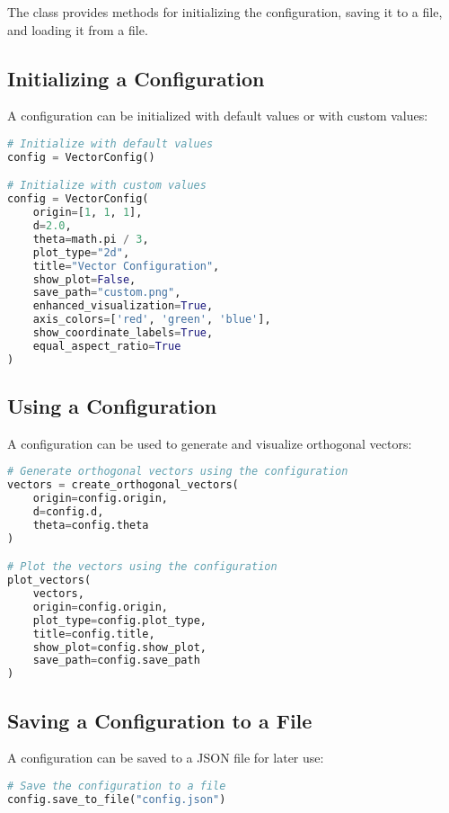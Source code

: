 The class provides methods for initializing the configuration, saving it to a file, and loading it from a file.

\subsection{Initializing a Configuration}

A configuration can be initialized with default values or with custom values:

\begin{lstlisting}[language=Python]
# Initialize with default values
config = VectorConfig()

# Initialize with custom values
config = VectorConfig(
    origin=[1, 1, 1],
    d=2.0,
    theta=math.pi / 3,
    plot_type="2d",
    title="Vector Configuration",
    show_plot=False,
    save_path="custom.png",
    enhanced_visualization=True,
    axis_colors=['red', 'green', 'blue'],
    show_coordinate_labels=True,
    equal_aspect_ratio=True
)
\end{lstlisting}

\subsection{Using a Configuration}

A configuration can be used to generate and visualize orthogonal vectors:

\begin{lstlisting}[language=Python]
# Generate orthogonal vectors using the configuration
vectors = create_orthogonal_vectors(
    origin=config.origin,
    d=config.d,
    theta=config.theta
)

# Plot the vectors using the configuration
plot_vectors(
    vectors,
    origin=config.origin,
    plot_type=config.plot_type,
    title=config.title,
    show_plot=config.show_plot,
    save_path=config.save_path
)
\end{lstlisting}

\subsection{Saving a Configuration to a File}

A configuration can be saved to a JSON file for later use:

\begin{lstlisting}[language=Python]
# Save the configuration to a file
config.save_to_file("config.json")
\end{lstlisting}

